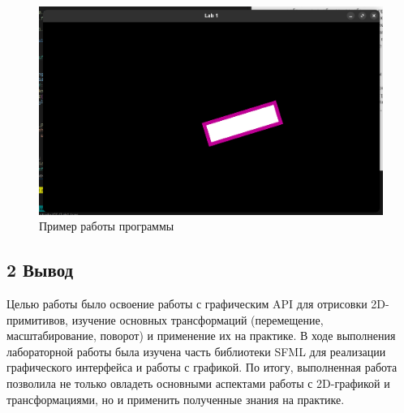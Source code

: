 \documentclass[12pt]{article}
\begin{document}
\begin{figure}[h]

\centering

\includegraphics[width=0.8\linewidth]{image.png}

\caption{Пример работы программы}

\label{fig:mpr}

\end{figure}


\subsection*{2 Вывод}

Целью работы было освоение работы с графическим API для отрисовки 2D-примитивов, изучение основных трансформаций (перемещение, масштабирование, поворот) и применение их на практике.
В ходе выполнения лабораторной работы была изучена часть библиотеки SFML для реализации графического интерфейса и работы с графикой. 
По итогу, выполненная работа позволила не только овладеть основными аспектами работы с 2D-графикой и трансформациями, но и применить полученные знания на практике.
\end{document}
